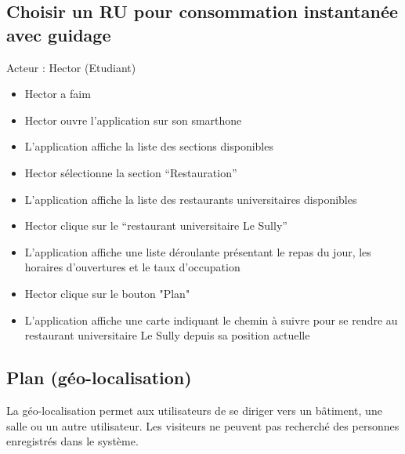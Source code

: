 \subsection*{Choisir un RU pour consommation instantanée avec guidage}
Acteur : Hector (Etudiant)
\begin{itemize}
\item Hector a faim 
\item Hector ouvre l’application sur son smarthone 
\item L’application affiche la liste des sections disponibles 
\item Hector sélectionne la section “Restauration” 
\item L’application affiche la liste des restaurants universitaires disponibles 
\item Hector clique sur le “restaurant universitaire Le Sully” 
\item L’application affiche une liste déroulante présentant le repas du jour, les horaires d’ouvertures et le taux d’occupation 
\item Hector clique sur le bouton "Plan"
\item L’application affiche une carte indiquant le chemin à suivre pour se rendre au restaurant universitaire Le Sully depuis sa position actuelle 
\end{itemize}

\newpage

\subsection{Plan (géo-localisation)}

La géo-localisation permet aux utilisateurs de se diriger vers un bâtiment, une salle ou un autre utilisateur. Les visiteurs ne peuvent pas recherché des personnes enregistrés dans le système.

